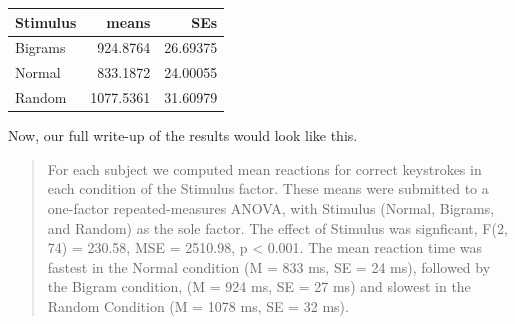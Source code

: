 \documentclass[]{book}
\newenvironment{Shaded}{\begin{snugshade}}{\end{snugshade}}
\newcommand{\KeywordTok}[1]{\textcolor[rgb]{0.13,0.29,0.53}{\textbf{#1}}}
\newcommand{\DataTypeTok}[1]{\textcolor[rgb]{0.13,0.29,0.53}{#1}}
\newcommand{\DecValTok}[1]{\textcolor[rgb]{0.00,0.00,0.81}{#1}}
\newcommand{\StringTok}[1]{\textcolor[rgb]{0.31,0.60,0.02}{#1}}
\newcommand{\OperatorTok}[1]{\textcolor[rgb]{0.81,0.36,0.00}{\textbf{#1}}}
\newcommand{\NormalTok}[1]{#1}
\begin{document}
\begin{Shaded}
\end{Shaded}

\begin{tabular}{l|r|r}
\hline
Stimulus & means & SEs\\
\hline
Bigrams & 924.8764 & 26.69375\\
\hline
Normal & 833.1872 & 24.00055\\
\hline
Random & 1077.5361 & 31.60979\\
\hline
\end{tabular}

Now, our full write-up of the results would look like this.

\begin{quote}
For each subject we computed mean reactions for correct keystrokes in
each condition of the Stimulus factor. These means were submitted to a
one-factor repeated-measures ANOVA, with Stimulus (Normal, Bigrams, and
Random) as the sole factor. The effect of Stimulus was signficant, F(2,
74) = 230.58, MSE = 2510.98, p \textless{} 0.001. The mean reaction time
was fastest in the Normal condition (M = 833 ms, SE = 24 ms), followed
by the Bigram condition, (M = 924 ms, SE = 27 ms) and slowest in the
Random Condition (M = 1078 ms, SE = 32 ms).
\end{quote}
\end{document}
